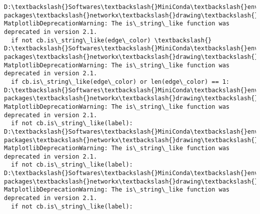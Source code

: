 \documentclass[11pt]{article}
\begin{document}
    \begin{Verbatim}[commandchars=\\\{\}]
D:\textbackslash{}Softwares\textbackslash{}MiniConda\textbackslash{}envs\textbackslash{}torch36\textbackslash{}lib\textbackslash{}site-packages\textbackslash{}networkx\textbackslash{}drawing\textbackslash{}nx\_pylab.py:522: MatplotlibDeprecationWarning: The is\_string\_like function was deprecated in version 2.1.
  if not cb.is\_string\_like(edge\_color) \textbackslash{}
D:\textbackslash{}Softwares\textbackslash{}MiniConda\textbackslash{}envs\textbackslash{}torch36\textbackslash{}lib\textbackslash{}site-packages\textbackslash{}networkx\textbackslash{}drawing\textbackslash{}nx\_pylab.py:543: MatplotlibDeprecationWarning: The is\_string\_like function was deprecated in version 2.1.
  if cb.is\_string\_like(edge\_color) or len(edge\_color) == 1:
D:\textbackslash{}Softwares\textbackslash{}MiniConda\textbackslash{}envs\textbackslash{}torch36\textbackslash{}lib\textbackslash{}site-packages\textbackslash{}networkx\textbackslash{}drawing\textbackslash{}nx\_pylab.py:724: MatplotlibDeprecationWarning: The is\_string\_like function was deprecated in version 2.1.
  if not cb.is\_string\_like(label):
D:\textbackslash{}Softwares\textbackslash{}MiniConda\textbackslash{}envs\textbackslash{}torch36\textbackslash{}lib\textbackslash{}site-packages\textbackslash{}networkx\textbackslash{}drawing\textbackslash{}nx\_pylab.py:724: MatplotlibDeprecationWarning: The is\_string\_like function was deprecated in version 2.1.
  if not cb.is\_string\_like(label):
D:\textbackslash{}Softwares\textbackslash{}MiniConda\textbackslash{}envs\textbackslash{}torch36\textbackslash{}lib\textbackslash{}site-packages\textbackslash{}networkx\textbackslash{}drawing\textbackslash{}nx\_pylab.py:724: MatplotlibDeprecationWarning: The is\_string\_like function was deprecated in version 2.1.
  if not cb.is\_string\_like(label):

    \end{Verbatim}

    \begin{center}
    \end{center}
    { \hspace*{\fill} \\}
    
\end{document}
